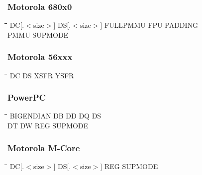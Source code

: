 \subsubsection{Motorola 680x0}
{\tt\begin{tabbing}
\hspace{3cm}\=\hspace{3cm}\=\hspace{3cm}\=\hspace{3cm}\=\kill
DC[.$<$size$>$]\> DS[.$<$size$>$] \> FULLPMMU    \> FPU         \> PADDING \\
PMMU       \> SUPMODE \\
\end{tabbing}}

\subsubsection{Motorola 56xxx}
{\tt\begin{tabbing}
\hspace{3cm}\=\hspace{3cm}\=\hspace{3cm}\=\hspace{3cm}\=\kill
DC         \> DS          \> XSFR        \> YSFR \\
\end{tabbing}}

\subsubsection{PowerPC}
{\tt\begin{tabbing}
\hspace{3cm}\=\hspace{3cm}\=\hspace{3cm}\=\hspace{3cm}\=\kill
BIGENDIAN  \> DB          \> DD          \> DQ          \> DS \\
DT         \> DW          \> REG         \> SUPMODE \\
\end{tabbing}}

\subsubsection{Motorola M-Core}
{\tt\begin{tabbing}
\hspace{3cm}\=\hspace{3cm}\=\hspace{3cm}\=\hspace{3cm}\=\kill
DC[.$<$size$>$] \> DS[.$<$size$>$] \> REG \> SUPMODE \\
\end{tabbing}}

